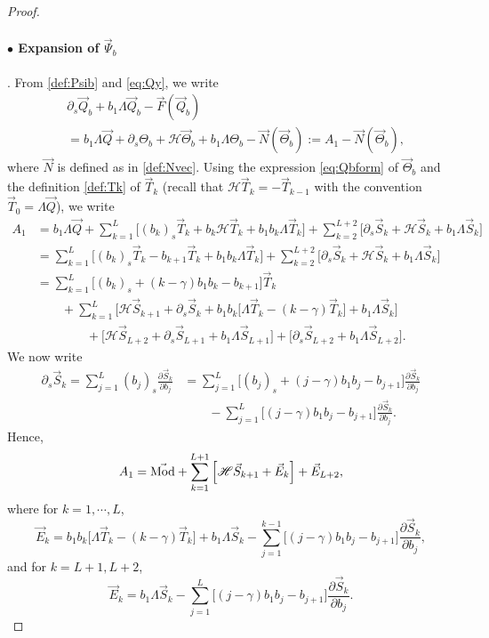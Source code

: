 \documentclass[11pt]{aims}
\theoremstyle{definition}
\numberwithin{equation}{section}
\begin{document}
\begin{proof}
\paragraph{$\bullet$ Expansion of $\vec \Psi_b$}. From \eqref{def:Psib} and \eqref{eq:Qy}, we write
\begin{align*}
&\partial_s \vec Q_{b}  + b_1 \Lambda \vec Q_b - \vec F(\vec Q_b)\\
&= b_1\Lambda \vec Q + \partial_s \Theta_b + {\mathscr{H}} \vec \Theta_b + b_1 \Lambda \Theta_b - \vec N(\vec \Theta_b) := A_1 - \vec N(\vec \Theta_b),
\end{align*}
where $\vec N$ is defined as in \eqref{def:Nvec}. Using the expression \eqref{eq:Qbform} of $\vec \Theta_b$ and the definition \eqref{def:Tk} of $\vec T_k$ (recall that ${\mathscr{H}} \vec T_k = -\vec T_{k-1}$ with the convention $\vec T_0 = \Lambda \vec Q$), we write 
\begin{align*}
A_1&= b_1 \Lambda \vec Q + \sum_{k = 1}^L \Big[(b_k)_s \vec T_k + b_k {\mathscr{H}} \vec T_k + b_1b_k\Lambda \vec T_k \Big] + \sum_{k = 2}^{L+2}\Big[\partial_s \vec S_k + {\mathscr{H}} \vec S_k + b_1 \Lambda \vec S_k\Big]\\
&=  \sum_{k = 1}^L \Big[(b_k)_s\vec T_k - b_{k+1}\vec T_k + b_1b_k \Lambda \vec T_k \Big] + \sum_{k = 2}^{L+2}\Big[\partial_s  \vec S_k + {\mathscr{H}} \vec S_k + b_1 \Lambda \vec S_k\Big]\\
&= \sum_{k = 1}^L \Big[(b_k)_s  + (k - \gamma)b_1b_k- b_{k+1}\Big]\vec T_k\\
&\qquad + \sum_{k = 1}^L\Big[{\mathscr{H}} \vec S_{k + 1} + \partial_s \vec S_k + b_1b_k \big[\Lambda \vec T_k - (k - \gamma)\vec T_k\big] + b_1 \Lambda \vec S_k\Big]\\
& \qquad\qquad+ \Big[{\mathscr{H}} \vec S_{L+2} + \partial_s \vec S_{L+1} + b_1\Lambda \vec S_{L+1}\Big] + \Big[\partial_s \vec S_{L+2} + b_1\Lambda \vec S_{L+2}\Big].
\end{align*}
We now write
\begin{align*}
\partial_s\vec S_k = \sum_{j = 1}^L(b_j)_s\frac{\partial \vec S_k}{\partial b_j} &= \sum_{j = 1}^L\Big[(b_j)_s + (j - \gamma)b_1b_j - b_{j + 1} \Big]\frac{\partial \vec S_k}{\partial b_j} \\
&\qquad - \sum_{j = 1}^L\Big[(j - \gamma)b_1b_j - b_{j + 1} \Big]\frac{\partial \vec S_k}{\partial b_j}.
\end{align*} 
Hence, 
\begin{align*}
A_1 = \vec{\textup{Mod}} + \sum_{k = 1}^{L+1}\left[{\mathscr{H}} \vec S_{k + 1} + \vec E_k\right] + \vec E_{L+2},
\end{align*}
where for $k = 1, \cdots, L$,
\begin{equation}\label{def:Ek1}
\vec E_k= b_1b_k \big[\Lambda \vec T_k - (k - \gamma)\vec T_k\big] + b_1 \Lambda \vec S_k - \sum_{j = 1}^{k-1}\Big[(j - \gamma)b_1b_j - b_{j + 1} \Big]\frac{\partial \vec S_k}{\partial b_j},
\end{equation} 
and for $k = L+1, L+2$,
\begin{equation}\label{def:EkL12}
\vec E_k = b_1 \Lambda \vec S_k - \sum_{j = 1}^{L}\Big[(j - \gamma)b_1b_j - b_{j + 1} \Big]\frac{\partial \vec S_k}{\partial b_j}.
\end{equation}


\end{proof}
\end{document}
